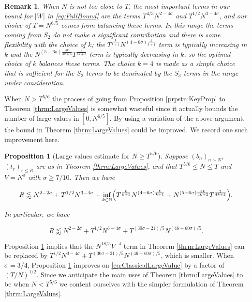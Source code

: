 \documentclass{amsart}
\theoremstyle{plain}
\newtheorem{prpstn}[thrm]{Proposition}
\newtheorem*{rmk}{Remark}
\numberwithin{equation}{section}
\begin{document}
%
%

\begin{rmk}
When $N$ is not too close to $T$, the most important terms in our bound for $|W|$ in \eqref{eq:FullBound} are the terms $T^{4/3}N^{2-4\sigma}$ and $T^{1/2}N^{3-4\sigma}$, and our choice of $T=N^{6/5}$ comes from balancing these terms. In this range the terms coming from $S_2$ do not make a significant contribution and there is some flexibility with the choice of $k$; the $T^{\frac{k}{k+1}}N^{(4-6\sigma)\frac{k}{k+1}}$ term is typically increasing in $k$ and the $N^{(5-6\sigma)\frac{4k}{4k+3}}T^{\frac{2}{4k+3}}$ term is typically decreasing in $k$, so the optimal choice of $k$ balances these terms. The choice $k=4$ is made as a simple choice that is sufficient for the $S_2$ terms to be dominated by the $S_3$ terms in the range under consideration.
\end{rmk}

%
%


When $N>T^{5/6}$ the process of going from Proposition \ref{prpstn:KeyProp} to Theorem \ref{thrm:LargeValues} is somewhat wasteful since it actually bounds the number of large values in $[0,N^{6/5}]$. By using a variation of the above argument, the bound in Theorem \ref{thrm:LargeValues} could be improved. We record one such improvement here.

\begin{prpstn}[Large values estimate for $N\ge T^{5/6}$]\label{prpstn:BigN}
Suppose $(b_n)_{n\sim N}$, $(t_r)_{r\le R}$ are as in Theorem \ref{thrm:LargeValues}, and that $T^{5/6}\le N\le T$ and $V=N^\sigma$ with $\sigma\ge 7/10$. Then we have

\[
R\lessapprox N^{2-2\sigma}+T^{1/2}N^{3-4\sigma}+\inf_{k\in\mathbb{N}}\Bigl(T^{\frac{k}{k+1}}N^{(4-6\sigma)\frac{k}{k+1}}+N^{(5-6\sigma)\frac{4k}{4k+3}}T^{\frac{2}{4k+3}}\Bigr).
\]

In particular, we have

\[
R\lessapprox N^{2-2\sigma}+T^{1/2}N^{3-4\sigma}+T^{(30\sigma-21)/5}N^{(46-60\sigma)/5}.
\]

\end{prpstn}

Proposition \ref{prpstn:BigN} implies that the $N^{18/5}V^{-4}$ term in Theorem \ref{thrm:LargeValues} can be replaced by $T^{1/2}N^{3-4\sigma}+T^{(30\sigma-21)/5}N^{(46-60\sigma)/5}$, which is smaller. When $\sigma=3/4$, Proposition \ref{prpstn:BigN} improves on \eqref{eq:ClassicalLargeValue} by a factor of $(T/N)^{1/2}$.  Since we anticipate the main uses of Theorem \ref{thrm:LargeValues} to be when $N<T^{5/6}$ we content ourselves with the simpler formulation of Theorem \ref{thrm:LargeValues}.
\end{document}
